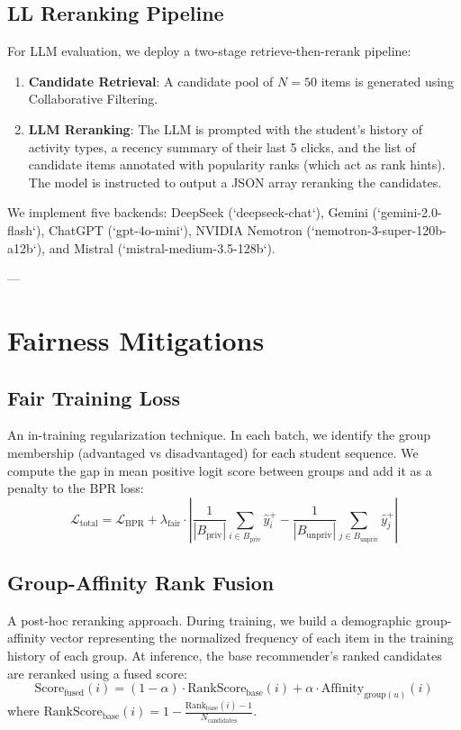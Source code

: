\documentclass[10pt,journal,compsoc]{IEEEtran}
\begin{document}
\subsection{LL Reranking Pipeline}
For LLM evaluation, we deploy a two-stage retrieve-then-rerank pipeline:
\begin{enumerate}
    \item \textbf{Candidate Retrieval}: A candidate pool of $N=50$ items is generated using Collaborative Filtering.
    \item \textbf{LLM Reranking}: The LLM is prompted with the student's history of activity types, a recency summary of their last 5 clicks, and the list of candidate items annotated with popularity ranks (which act as rank hints). The model is instructed to output a JSON array reranking the candidates.
\end{enumerate}
We implement five backends: DeepSeek (`deepseek-chat`), Gemini (`gemini-2.0-flash`), ChatGPT (`gpt-4o-mini`), NVIDIA Nemotron (`nemotron-3-super-120b-a12b`), and Mistral (`mistral-medium-3.5-128b`).

---

\section{Fairness Mitigations}

\subsection{Fair Training Loss}
An in-training regularization technique. In each batch, we identify the group membership (advantaged vs disadvantaged) for each student sequence. We compute the gap in mean positive logit score between groups and add it as a penalty to the BPR loss:
$$\mathcal{L}_{\text{total}} = \mathcal{L}_{\text{BPR}} + \lambda_{\text{fair}} \cdot \left| \frac{1}{|B_{\text{priv}}|} \sum_{i \in B_{\text{priv}}} \hat{y}_i^+ - \frac{1}{|B_{\text{unpriv}}|} \sum_{j \in B_{\text{unpriv}}} \hat{y}_j^+ \right|$$

\subsection{Group-Affinity Rank Fusion}
A post-hoc reranking approach. During training, we build a demographic group-affinity vector representing the normalized frequency of each item in the training history of each group. At inference, the base recommender's ranked candidates are reranked using a fused score:
$$\text{Score}_{\text{fused}}(i) = (1 - \alpha) \cdot \text{RankScore}_{\text{base}}(i) + \alpha \cdot \text{Affinity}_{\text{group}(u)}(i)$$
where $\text{RankScore}_{\text{base}}(i) = 1 - \frac{\text{Rank}_{\text{base}}(i) - 1}{N_{\text{candidates}}}$.
\end{document}
